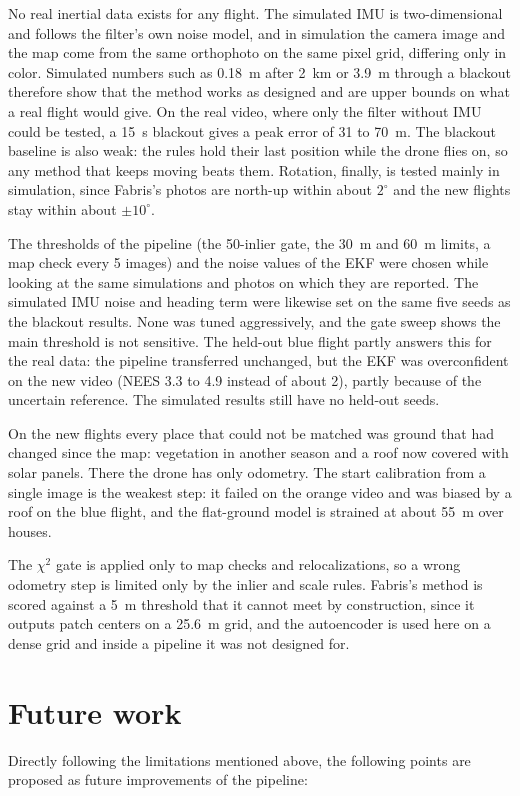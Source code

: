 \documentclass[english, Lau, oneside]{sapthesis}%
\begin{document}
No real inertial data exists for any flight. The simulated IMU is two-dimensional and follows the filter's own noise model, and in simulation the camera image and the map come from the same orthophoto on the same pixel grid, differing only in color. Simulated numbers such as 0.18~m after 2~km or 3.9~m through a blackout therefore show that the method works as designed and are upper bounds on what a real flight would give. On the real video, where only the filter without IMU could be tested, a 15~s blackout gives a peak error of 31 to 70~m. The blackout baseline is also weak: the rules hold their last position while the drone flies on, so any method that keeps moving beats them. Rotation, finally, is tested mainly in simulation, since Fabris's photos are north-up within about $2^\circ$ and the new flights stay within about $\pm 10^\circ$.

The thresholds of the pipeline (the 50-inlier gate, the 30~m and 60~m limits, a map check every 5 images) and the noise values of the EKF were chosen while looking at the same simulations and photos on which they are reported. The simulated IMU noise and heading term were likewise set on the same five seeds as the blackout results. None was tuned aggressively, and the gate sweep shows the main threshold is not sensitive. The held-out blue flight partly answers this for the real data: the pipeline transferred unchanged, but the EKF was overconfident on the new video (NEES 3.3 to 4.9 instead of about 2), partly because of the uncertain reference. The simulated results still have no held-out seeds.

On the new flights every place that could not be matched was ground that had changed since the map: vegetation in another season and a roof now covered with solar panels. There the drone has only odometry. The start calibration from a single image is the weakest step: it failed on the orange video and was biased by a roof on the blue flight, and the flat-ground model is strained at about 55~m over houses.

The $\chi^2$ gate is applied only to map checks and relocalizations, so a wrong odometry step is limited only by the inlier and scale rules. Fabris's method is scored against a 5~m threshold that it cannot meet by construction, since it outputs patch centers on a 25.6~m grid, and the autoencoder is used here on a dense grid and inside a pipeline it was not designed for.

\clearpage%
\section{Future work}
\label{sec:future-work}
Directly following the limitations mentioned above, the following points are proposed as future improvements of the pipeline:
\end{document}
